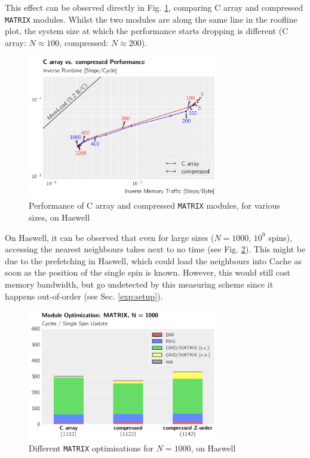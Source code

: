 \documentclass[letterpaper]{article}
\begin{document}
This effect can be observed directly in Fig. \ref{roof:storage}, comparing C array and compressed \texttt{MATRIX} modules. Whilst the two modules are along the same line in the roofline plot, the system size at which the performance starts dropping is different (C array: $N \approx 100$, compressed: $N \approx 200$). 
	\begin{figure}[h]\centering
	\includegraphics[width = 8.36cm]{plots/roofline_1.pdf}
	\caption{Performance of C array and compressed \texttt{MATRIX} modules, for various sizes, on Haswell}
	\label{roof:storage}
	\end{figure}\newline
On Haswell, it can be observed that even for large sizes ($N=1000$, $10^9$ spins), accessing the nearest neighbours takes next to no time (see Fig. \ref{MATRIX:Has:1000}). This might be due to the prefetching in Haswell, which could load the neighbours into Cache as soon as the position of the single spin is known. However, this would still cost memory bandwidth, but go undetected by this measuring scheme since it happens out-of-order (see Sec. \ref{exp:setup}). 
	\begin{figure}[h]\centering
	  \includegraphics[width = 8.36cm]{plots/dg_1000_3.pdf}
	  \caption{Different \texttt{MATRIX} optimisations for $N = 1000$, on Haswell}
	  \label{MATRIX:Has:1000}
	\end{figure}
\end{document}

